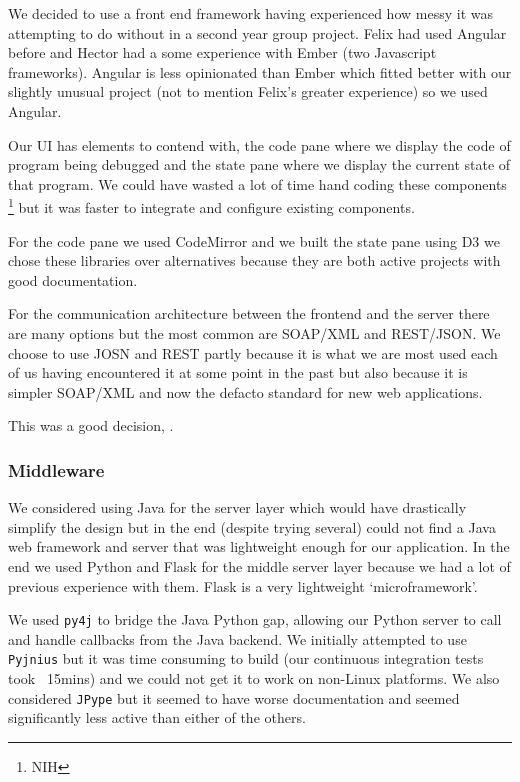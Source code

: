\documentclass[11pt, a4paper]{article}
\newcommand{\cmd}[1]{{\tt #1}}
\begin{document}
We decided to use a front end framework having experienced how messy it was attempting to do without in a second year group project.
Felix had used Angular before and Hector had a some experience with Ember (two Javascript frameworks).
Angular is less opinionated than Ember which fitted better with our slightly unusual project (not to mention Felix's greater experience) so we used Angular.

Our UI has elements to contend with, the code pane where we display the code of program being debugged and the state pane where we display the current state of that program.
We could have wasted a lot of time hand coding these components \footnote{NIH} but it was faster to integrate and configure existing components.

For the code pane we used CodeMirror\cite{CodeMirror} and we built the state pane using D3 we chose these libraries over alternatives because they are both active projects with good documentation. 

For the communication architecture between the frontend and the server there are many options but the most common are SOAP/XML and REST/JSON.
We choose to use JOSN and REST partly because it is what we are most used each of us having encountered it at some point in the past but also because it is simpler SOAP/XML and now the defacto standard for new web applications.

This was a good decision, .

\subsubsection{Middleware}
We considered using Java for the server layer which would have drastically simplify the design but in the end (despite trying several) could not find a Java web framework and server that was lightweight enough for our application. 
In the end we used Python and Flask for the middle server layer because we had a lot of previous experience with them.
Flask is a very lightweight `microframework'.

We used \cmd{py4j} to bridge the Java Python gap, allowing our Python server to call and handle callbacks from the Java backend.
We initially attempted to use \cmd{Pyjnius} but it was time consuming to build (our continuous integration tests took ~15mins) and we could not get it to work on non-Linux platforms.
We also considered \cmd{JPype} but it seemed to have worse documentation and seemed significantly less active than either of the others.    
\end{document}
